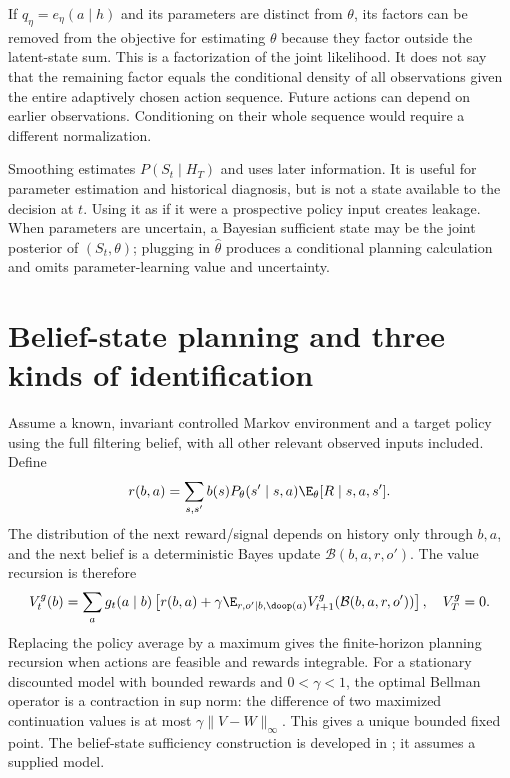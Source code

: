 If $q_\eta=e_\eta(a\mid h)$ and its parameters are distinct from
$\theta$, its factors can be removed from the objective for estimating
$\theta$ because they factor outside the latent-state sum. This is
a factorization of the joint likelihood. It does not say that the
remaining factor equals the conditional density of all observations
given the entire adaptively chosen action sequence. Future actions can
depend on earlier observations. Conditioning on their whole sequence
would require a different normalization.

Smoothing estimates $P(S_t\mid H_T)$ and uses later information.
It is useful for parameter estimation and historical diagnosis, but
is not a state available to the decision at $t$. Using it as if it
were a prospective policy input creates leakage. When parameters are
uncertain, a Bayesian sufficient state may be the joint posterior of
$(S_t,\theta)$; plugging in $\widehat\theta$ produces a conditional
planning calculation and omits parameter-learning value and uncertainty.

\section{Belief-state planning and three kinds of identification}
\label{r3:belief-value}
Assume a known, invariant controlled Markov environment and a target
policy using the full filtering belief, with all other relevant observed
inputs included. Define
\[
 r(b,a)=\sum_{s,s'}b(s)P_\theta(s'\mid s,a)
                              \E_\theta[R\mid s,a,s'].
\]
The distribution of the next reward/signal depends on history only
through $b,a$, and the next belief is a deterministic Bayes update
$\mathcal B(b,a,r,o')$. The value recursion is therefore
\begin{equation}
 V_t^g(b)=\sum_a g_t(a\mid b)
       \left[r(b,a)+\gamma\E_{r,o'\mid b,\doop(a)}
            V_{t+1}^g(\mathcal B(b,a,r,o'))\right],
 \quad V_T^g=0.
 \label{r3:belief-bellman}
\end{equation}
Replacing the policy average by a maximum gives the finite-horizon
planning recursion when actions are feasible and rewards integrable.
For a stationary discounted model with bounded rewards and
$0<\gamma<1$, the optimal Bellman operator is a contraction in sup norm:
the difference of two maximized continuation values is at most
$\gamma\|V-W\|_\infty$. This gives a unique bounded fixed point.
The belief-state sufficiency construction is developed in
\citet[Sections 3.2--3.4]{kaelbling1998}; it assumes a supplied model.

